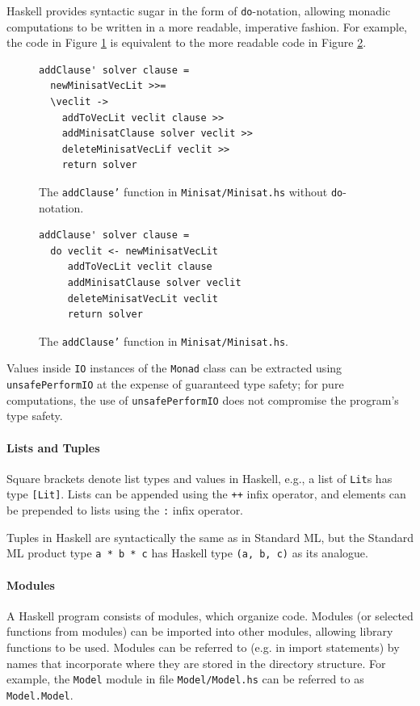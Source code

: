\documentclass[12pt,a4paper,twoside,openright]{report}
\begin{document}
{Haskell provides syntactic sugar
in the form of \verb,do,-notation, allowing monadic computations
to be written in a more readable, imperative fashion. For example, the code in Figure
\ref{monad} is equivalent to the more readable code in Figure \ref{do}.

\begin{figure}[t]
\centering
\begin{lstlisting}
addClause' solver clause =
  newMinisatVecLit >>=
  \veclit ->
    addToVecLit veclit clause >> 
    addMinisatClause solver veclit >>
    deleteMinisatVecLif veclit >>
    return solver
\end{lstlisting}
\caption{The {\tt addClause'} function in {\tt Minisat/Minisat.hs} without
{\tt do}-notation.}
\label{monad}
\end{figure}
\begin{figure}[t]
\centering
\begin{lstlisting}
addClause' solver clause =
  do veclit <- newMinisatVecLit
     addToVecLit veclit clause
     addMinisatClause solver veclit
     deleteMinisatVecLit veclit
     return solver
\end{lstlisting}
\caption{The {\tt addClause'} function in {\tt Minisat/Minisat.hs}.}
\label{do}
\end{figure}

Values inside \verb,IO, instances of the \verb,Monad, class can be extracted
using \verb,unsafePerformIO, at the expense of guaranteed type safety; for pure
computations, the use of \verb,unsafePerformIO, does not compromise the
program's type safety.
}

\paragraph{Lists and Tuples}{
Square brackets denote list types and values in Haskell, e.g.,
a list of \verb,Lit,s has type \verb,[Lit],.
Lists can be appended using the \verb,++, infix operator, and elements
can be prepended to lists using the \verb,:, infix operator.

Tuples in Haskell are syntactically the same as in Standard ML, but the
Standard ML product type \verb,a * b * c, has Haskell type \verb.(a, b, c).
as its analogue.
}

\paragraph{Modules}{
A Haskell program consists of modules, which organize code.
Modules (or selected functions from modules) can be imported into other
modules, allowing library functions to be used. Modules can be referred
to (e.g. in import statements) by names that incorporate where they are
stored in the directory structure. For example, the \verb,Model, module in file
\verb,Model/Model.hs, can be referred to as \verb,Model.Model,.
}
\end{document}
